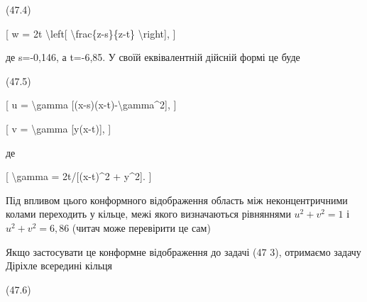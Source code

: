 \documentclass[
]{article}
\begin{document}
(47.4)

{[} w = 2t \textbackslash left{[} \textbackslash frac\{z-s\}\{z-t\}
\textbackslash right{]}, {]}

де s=-0,146, а t=-6,85. У своїй еквівалентній дійсній формі це буде

(47.5)

{[} u = \textbackslash gamma {[}(x-s)(x-t)-\textbackslash gamma\^{}2{]},
{]}

{[} v = \textbackslash gamma {[}y(x-t){]}, {]}

де

{[} \textbackslash gamma = 2t/{[}(x-t)\^{}2 + y\^{}2{]}. {]}

Під впливом цього конформного відображення область між неконцентричними
колами переходить у кільце, межі якого визначаються рівняннями
\(u^2 + v^2 = 1\) і \(u^2 + v^2 = 6,86\) (читач може перевірити це сам)

Якщо застосувати це конформне відображення до задачі (47 3), отримаємо
задачу Діріхле всередині кільця

(47.6)
\end{document}

